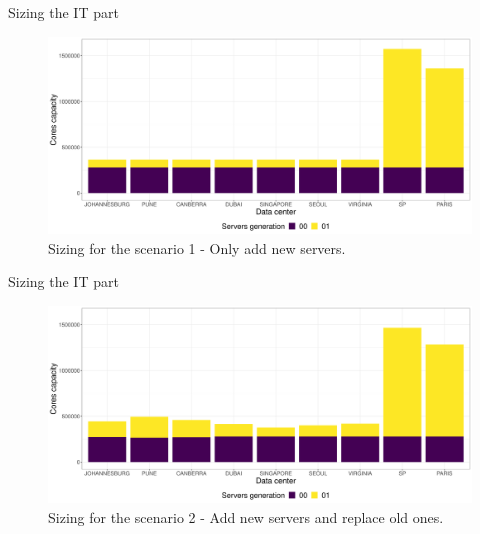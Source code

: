 \documentclass[Ligatures=TeX,table,svgnames,usetotalslideindicator,compress,10pt]{beamer}
\begin{document}
\begin{frame}{Sizing the IT part}
  
  \begin{center}
    \begin{figure}[h]
      \centering
      \includegraphics[width=\textwidth]{images/cloud_federation_only_add.png}
      \caption{Sizing for the scenario 1 - Only add new servers.}
    \end{figure}
  \end{center}


\end{frame}
\begin{frame}{Sizing the IT part}
  

  \begin{center}
    \begin{figure}[h]
      \centering
      \includegraphics[width=\textwidth]{images/cloud_federation_add_replace.png}
      \caption{Sizing for the scenario 2 - Add new servers and replace old ones.}
    \end{figure}
  \end{center}


\end{frame}
\end{document}
